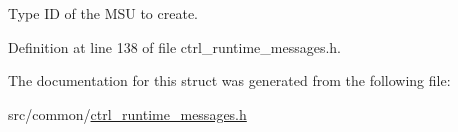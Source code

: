 Type I\-D of the M\-S\-U to create. 



Definition at line 138 of file ctrl\-\_\-runtime\-\_\-messages.\-h.



The documentation for this struct was generated from the following file\-:\begin{DoxyCompactItemize}
\item 
src/common/\hyperlink{ctrl__runtime__messages_8h}{ctrl\-\_\-runtime\-\_\-messages.\-h}\end{DoxyCompactItemize}
